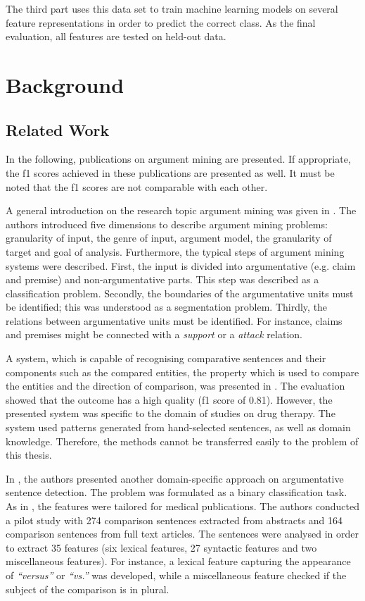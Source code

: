 The third part uses this data set to train machine learning models on several feature representations in order to predict the correct class. As the final evaluation, all features are tested on held-out data.

\chapter{Background}
\section{Related Work}
\label{sec:argth}
\label{sec:argmine}
In the following, publications on argument mining are presented. If appropriate, the f1 scores achieved in these publications are presented as well. It must be noted that the f1 scores are not comparable with each other.

A general introduction on the research topic argument mining was given in \cite{Lippi2016Argumentation-M}.
The authors introduced five dimensions to describe argument mining problems: granularity of input, the genre of input, argument model, the granularity of target and goal of analysis.  Furthermore, the typical steps of argument mining systems were described. First, the input is divided into argumentative (e.g. claim and premise) and non-argumentative parts. This step was described as a classification problem. Secondly, the boundaries of the argumentative units must be identified; this was understood as a segmentation problem. Thirdly, the relations between argumentative units must be identified. For instance, claims and premises might be connected with a \emph{support} or a \emph{attack} relation.



A system, which is capable of recognising comparative sentences and their components such as the compared entities, the property which is used to compare the entities and the direction of comparison, was presented in \cite{fiszman2007interpreting}. The evaluation showed that the outcome has a high quality (f1 score of 0.81). However, the presented system was specific to the domain of studies on drug therapy. The system used patterns generated from hand-selected sentences, as well as domain knowledge. Therefore, the methods cannot be transferred easily to the problem of this thesis.

In \cite{park2012identifying}, the authors presented another domain-specific approach on argumentative sentence detection. The problem was formulated as a binary classification task. As in \cite{fiszman2007interpreting}, the features were tailored for medical publications. The authors conducted a pilot study with 274 comparison sentences extracted from abstracts and 164 comparison sentences from full text articles. The sentences were analysed in order to extract 35 features (six lexical features, 27 syntactic features and two miscellaneous features). For instance, a lexical feature capturing the appearance of \emph{\enquote{versus}} or \emph{\enquote{vs.}} was developed, while a miscellaneous feature checked if the subject of the comparison is in plural. 


